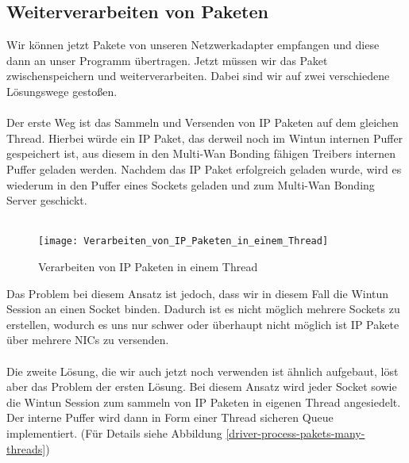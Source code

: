 \newpage

\subsection{Weiterverarbeiten von Paketen}
Wir können jetzt Pakete von unseren Netzwerkadapter empfangen und diese dann an unser Programm übertragen. Jetzt müssen wir das Paket zwischenspeichern und weiterverarbeiten. Dabei sind wir auf zwei verschiedene Lösungswege gestoßen.
\\\\
Der erste Weg ist das Sammeln und Versenden von IP Paketen auf dem gleichen Thread. Hierbei würde ein IP Paket, das derweil noch im Wintun internen Puffer gespeichert ist, aus diesem in den Multi-Wan Bonding fähigen Treibers internen Puffer geladen werden. Nachdem das IP Paket erfolgreich geladen wurde, wird es wiederum in den Puffer eines Sockets geladen und zum Multi-Wan Bonding Server geschickt. 
\\\\
\begin{figure}[H]
    \centering
    \texttt{[image: Verarbeiten\_von\_IP\_Paketen\_in\_einem\_Thread]}
    \caption[Verarbeiten von IP Paketen in einem Thread]{Verarbeiten von IP Paketen in einem Thread}
    \label{driver-process-pakets-one-thread}
\end{figure}
\noindent
Das Problem bei diesem Ansatz ist jedoch, dass wir in diesem Fall die Wintun Session an einen Socket binden. Dadurch ist es nicht möglich mehrere Sockets zu erstellen, wodurch es uns nur schwer oder überhaupt nicht möglich ist IP Pakete über mehrere NICs zu versenden. 
\\\\
Die zweite Lösung, die wir auch jetzt noch verwenden ist ähnlich aufgebaut, löst aber das Problem der ersten Lösung. Bei diesem Ansatz wird jeder Socket sowie die Wintun Session zum sammeln von IP Paketen in eigenen Thread angesiedelt. Der interne Puffer wird dann in Form einer Thread sicheren Queue implementiert. (Für Details siehe Abbildung \ref{driver-process-pakets-many-threads})

\newpage


